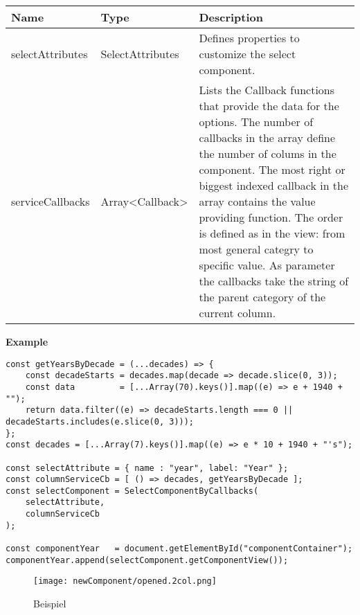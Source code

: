 \begin{table}[!htb] 
    \label{api:selectComponentByCallbacksParameter}
    \footnotesize
    \setlength\extrarowheight{4pt}
    \begin{tabular}{ p{3.5cm} p{3.5cm} p{5.5cm} }
        \toprule[1.2pt]
        \textbf{Name}    & \textbf{Type}    & \textbf{Description} \\
        \midrule
        selectAttributes & SelectAttributes & Defines properties to customize the select component. \\
        serviceCallbacks & Array<Callback>  & Lists the Callback functions that provide the data for the options. 
                                              The number of callbacks in the array define the number of colums in the component. 
                                              The most right or biggest indexed callback in the array contains the value providing function. 
                                              The order is defined as in the view: from most general categry to specific value. 
                                              As parameter the callbacks take the string of the parent category of the current column. \\
        \bottomrule[1.2pt]
    \end{tabular}
\end{table}

\vspace*{6pt}
\noindent
\textbf{Example}

\begin{lstlisting}[style = htmlcssjs, label = api:selectComponentCbExample]
const getYearsByDecade = (...decades) => {
    const decadeStarts = decades.map(decade => decade.slice(0, 3));
    const data         = [...Array(70).keys()].map((e) => e + 1940 + "");
    return data.filter((e) => decadeStarts.length === 0 || decadeStarts.includes(e.slice(0, 3)));
};
const decades = [...Array(7).keys()].map((e) => e * 10 + 1940 + "'s");

const selectAttribute = { name : "year", label: "Year" };
const columnServiceCb = [ () => decades, getYearsByDecade ];
const selectComponent = SelectComponentByCallbacks(
    selectAttribute,
    columnServiceCb
);

const componentYear   = document.getElementById("componentContainer");
componentYear.append(selectComponent.getComponentView());
\end{lstlisting}
    
\begin{figure}[!htb]
    \centering
    \texttt{[image: newComponent/opened.2col.png]}
    \caption*{\centering Beispiel }
    \label{api:selectComponentCbImg}
\end{figure}


